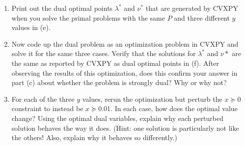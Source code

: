 \documentclass[11pt]{article}
\begin{document}
\begin{enumerate}
\begin{enumerate}
  \item Print out the dual optimal points $\lambda^*$ and $\nu^*$ that are
    generated by CVXPY when you solve the primal problems with the same $P$ and
    three different $y$ values in (e).

  \item Now code up the dual problem as an optimization problem in CVXPY and
    solve it for the same three cases. Verify that the solutions for $\lambda^*$
    and $\nu*$ are the same as reported by CVXPY as dual optimal points in
    (f). After observing the results of this optimization, does this confirm
    your answer in part (c) about whether the problem is strongly dual? Why or
    why not?

  \item For each of the three $y$ values, rerun the optimization but perturb the
    $x \succeq 0$ constraint to instead be $x \succeq 0.01$. In each case, how
    does the optimal value change? Using the optimal dual variables, explain why
    each perturbed solution behaves the way it does. (Hint: one solution is
    particularly not like the others! Also, explain why it behaves so
    differently.)

  \end{enumerate}

\end{enumerate}
\end{document}
